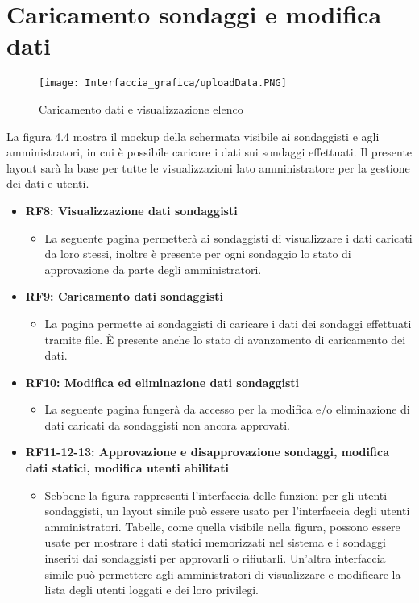 \section{Caricamento sondaggi e modifica dati}
    \begin{figure}[H]
        \center
        \texttt{[image: Interfaccia\_grafica/uploadData.PNG]}
        \caption{Caricamento dati e visualizzazione elenco}
    \end{figure} 
    La figura 4.4 mostra il mockup della schermata visibile ai sondaggisti e agli amministratori, in cui è possibile caricare i dati sui sondaggi effettuati.\newline
    Il presente layout sarà la base per tutte le visualizzazioni lato amministratore per la gestione dei dati e utenti.
    \begin{itemize}
        \item \textbf{RF8: Visualizzazione dati sondaggisti} \begin{itemize}
            \item La seguente pagina permetterà ai sondaggisti di visualizzare i dati caricati da loro stessi, inoltre è presente per ogni sondaggio lo stato di approvazione da parte degli amministratori.
        \end{itemize}
        \item \textbf{RF9: Caricamento dati sondaggisti} \begin{itemize}
            \item La pagina permette ai sondaggisti di caricare i dati dei sondaggi effettuati tramite file. È presente anche lo stato di avanzamento di caricamento dei dati.
        \end{itemize}
        \item \textbf{RF10: Modifica ed eliminazione dati sondaggisti} \begin{itemize}
            \item La seguente pagina fungerà da accesso per la modifica e/o eliminazione di dati caricati da sondaggisti non ancora approvati.
        \end{itemize}
        \item \textbf{RF11-12-13: Approvazione e disapprovazione sondaggi, modifica dati statici, modifica utenti abilitati} \begin{itemize}
            \item Sebbene la figura rappresenti l'interfaccia delle funzioni per gli utenti sondaggisti, un layout simile può essere usato per l'interfaccia degli utenti amministratori. Tabelle, come quella visibile nella figura, possono essere usate per mostrare i dati statici memorizzati nel sistema e i sondaggi inseriti dai sondaggisti per approvarli o rifiutarli. Un'altra interfaccia simile può permettere agli amministratori di visualizzare e modificare la lista degli utenti loggati e dei loro privilegi.

\end{itemize}
\end{itemize}
